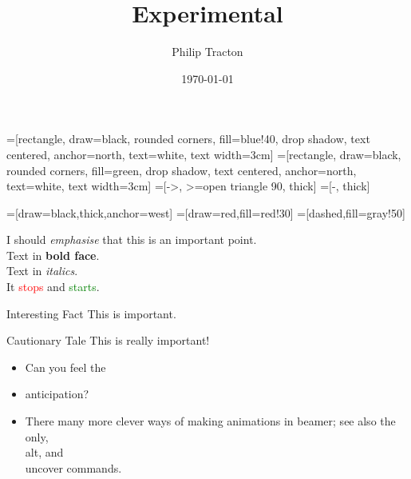 \documentclass[xcolor=svgnames, 12pt]{beamer}
\author[P. Tracton]{Philip Tracton}
\institute[UCLA Extension]{
UCLA Extension\\
Department of Engineering and Technology\\
Los Angeles, CA 91340\\
}
\date{\today}
\title[Experimental]{Experimental}
\begin{document}
=[rectangle, draw=black, rounded corners, fill=blue!40, drop shadow,
        text centered, anchor=north, text=white, text width=3cm]
=[rectangle, draw=black, rounded corners, fill=green, drop shadow,
        text centered, anchor=north, text=white, text width=3cm]
=[->, >=open triangle 90, thick]
=[-, thick]

=[draw=black,thick,anchor=west]
=[draw=red,fill=red!30]
=[dashed,fill=gray!50]

\def\Households{Households}
\def\Firms{Firms}
\def\Banks{Banks}

\def\DF{D_{F,t}} \def \DB {D_{B,t}} \def\Dividends{Dividends}
\def\NL{\mathit{NL}_{t}} \def\NewLoans{New loans}
\def\WB{\mathit{WB}_{t}} \def\Wages{Wages}
\def\SA{C_{t}} \def\Consumption{Consumption}
\def\INT{\mathit{INT}_t} \def\Interests{Interests}
\def\RL{\mathit {RL}_{t}} \def\PaidBackLoans{Paid back loans}


\begin{frame}

I should \emph{emphasise} that this is an \alert{important} point.\\

Text in \textbf{bold face}.\\
Text in \textit{italics}.\\

It \textcolor{red}{stops} and \textcolor{green}{starts}.\\

\begin{block}{Interesting Fact}
This is important.
\end{block}

\begin{alertblock}{Cautionary Tale}
This is really important!
\end{alertblock}

%

\end{frame}

\begin{frame}
\begin{itemize}
    \item Can you feel the
    \pause \item anticipation?
    \item There many more clever ways of making animations in beamer; see also the \\only, \\alt, and \\uncover commands.
\end{itemize}
\end{frame}
\begin{frame}
\end{frame}
\end{document}
